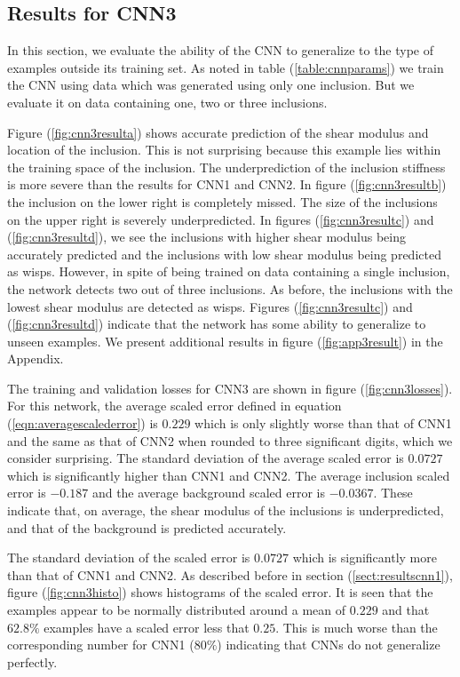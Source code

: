\documentclass[12pt]{article}
\begin{document}
\subsection{\label{sect:resultscnn3}Results for CNN3}
In this section, we evaluate the ability of the CNN to generalize to the type of examples outside its training set. As noted in table (\ref{table:cnnparams}) we train the CNN using data which was generated using only one inclusion. But we evaluate it on data containing one, two or three inclusions.

Figure (\ref{fig:cnn3resulta}) shows accurate prediction of the shear modulus and location of the inclusion. This is not surprising because this example lies within the training space of the inclusion. The underprediction of the inclusion stiffness is more severe than the results for CNN1 and CNN2. In figure (\ref{fig:cnn3resultb}) the inclusion on the lower right is completely missed. The size of the inclusions on the upper right is severely underpredicted. In figures (\ref{fig:cnn3resultc}) and (\ref{fig:cnn3resultd}), we see the inclusions with higher shear modulus being accurately predicted and the inclusions with low shear modulus being predicted as wisps. However, in spite of being trained on data containing a single inclusion, the network detects two out of three inclusions. As before, the inclusions with the lowest shear modulus are detected as wisps. Figures (\ref{fig:cnn3resultc}) and (\ref{fig:cnn3resultd}) indicate that the network has some ability to generalize to unseen examples. We present additional results in figure (\ref{fig:app3result}) in the Appendix.

The training and validation losses for CNN3 are shown in figure (\ref{fig:cnn3losses}). For this network, the average scaled error defined in equation (\ref{eqn:averagescalederror}) is $0.229$ which is only slightly worse than that of CNN1 and the same as that of CNN2 when rounded to three significant digits, which we consider surprising. The standard deviation of the average scaled error is $0.0727$ which is significantly higher than CNN1 and CNN2. The average inclusion scaled error is $-0.187$ and the average background scaled error is $-0.0367$. These indicate that, on average, the shear modulus of the inclusions is underpredicted, and that of the background is predicted accurately.

The standard deviation of the scaled error is $0.0727$ which is significantly more than that of CNN1 and CNN2. As described before in section (\ref{sect:resultscnn1}), figure (\ref{fig:cnn3histo}) shows histograms of the scaled error. It is seen that the examples appear to be normally distributed around a mean of ${0.229}$ and that $62.8\%$ examples have a scaled error less that $0.25$. This is much worse than the corresponding number for CNN1 ($80\%$) indicating that CNNs do not generalize perfectly.
\end{document}
